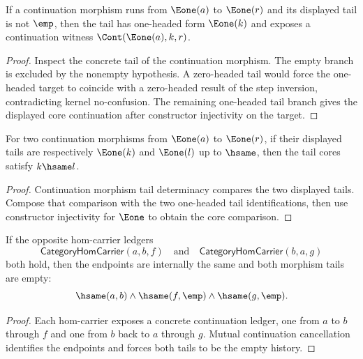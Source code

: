 \begin{theorem}
\label{thm:category-continuation-morphism-e1-source-e1-target-nonempty-tail-cases}
If a continuation morphism runs from $\Eone(a)$ to $\Eone(r)$ and its displayed
tail is not $\emp$, then the tail has one-headed form $\Eone(k)$ and exposes a
continuation witness $\Cont(\Eone(a),k,r)$.
\end{theorem}
\begin{proof}
Inspect the concrete tail of the continuation morphism. The empty branch is
excluded by the nonempty hypothesis. A zero-headed tail would force the
one-headed target to coincide with a zero-headed result of the step inversion,
contradicting kernel no-confusion. The remaining one-headed tail branch gives
the displayed core continuation after constructor injectivity on the target.
\end{proof}

\begin{theorem}
\label{thm:category-continuation-morphism-e1-source-e1-target-tail-core-deterministic}
For two continuation morphisms from $\Eone(a)$ to $\Eone(r)$, if their displayed
tails are respectively $\Eone(k)$ and $\Eone(l)$ up to $\hsame$, then the tail
cores satisfy $k\hsame l$.
\end{theorem}
\begin{proof}
Continuation morphism tail determinacy compares the two displayed tails. Compose
that comparison with the two one-headed tail identifications, then use
constructor injectivity for $\Eone$ to obtain the core comparison.
\end{proof}

\begin{theorem}
\label{thm:category-hom-carrier-cycle-tails-empty}
If the opposite hom-carrier ledgers
$$
\mathsf{CategoryHomCarrier}(a,b,f)
\quad\text{and}\quad
\mathsf{CategoryHomCarrier}(b,a,g)
$$
both hold, then the endpoints are internally the same and both morphism tails
are empty:
$$
\hsame(a,b)\land \hsame(f,\emp)\land \hsame(g,\emp).
$$
\end{theorem}
\begin{proof}
Each hom-carrier exposes a concrete continuation ledger, one from $a$ to $b$
through $f$ and one from $b$ back to $a$ through $g$. Mutual continuation
cancellation identifies the endpoints and forces both tails to be the empty
history.
\end{proof}

